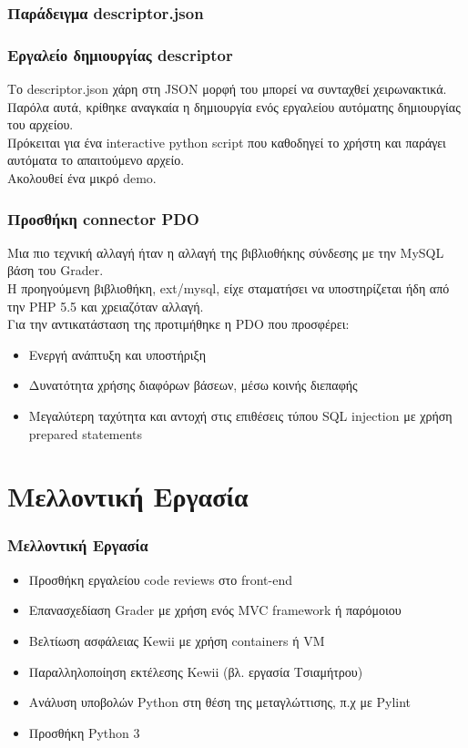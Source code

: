 \documentclass{beamer}
\begin{document}
\begin{frame}
  \frametitle{Παράδειγμα descriptor.json}


\end{frame}

\begin{frame}
  \frametitle{Εργαλείο δημιουργίας descriptor}

  Το descriptor.json χάρη στη JSON μορφή του μπορεί να συνταχθεί χειρωνακτικά. \\[0.3cm]

  Παρόλα αυτά, κρίθηκε αναγκαία η δημιουργία ενός εργαλείου αυτόματης δημιουργίας
  του αρχείου.\\[0.3cm]

  Πρόκειται για ένα interactive python script που καθοδηγεί το χρήστη και παράγει
  αυτόματα το απαιτούμενο αρχείο. \\[0.3cm]

  Ακολουθεί ένα μικρό demo.
\end{frame}

\begin{frame}
  \frametitle{Προσθήκη connector PDO}

  Μια πιο τεχνική αλλαγή ήταν η αλλαγή της βιβλιοθήκης σύνδεσης με την MySQL βάση
  του Grader.\\[0.3cm]

  Η προηγούμενη βιβλιοθήκη, ext/mysql, είχε σταματήσει να υποστηρίζεται ήδη από
  την PHP 5.5 και χρειαζόταν αλλαγή.\\[0.3cm]

  Για την αντικατάσταση της προτιμήθηκε η PDO που προσφέρει:

  \begin{itemize}
      \item Ενεργή ανάπτυξη και υποστήριξη
      \item Δυνατότητα χρήσης διαφόρων βάσεων, μέσω κοινής διεπαφής
      \item Μεγαλύτερη ταχύτητα και αντοχή στις επιθέσεις τύπου SQL injection με
        χρήση prepared statements
  \end{itemize}
\end{frame}

\section{Μελλοντική Εργασία}
\begin{frame}
  \frametitle{Μελλοντική Εργασία}
  \begin{itemize}
      \item Προσθήκη εργαλείου code reviews στο front-end
      \item Επανασχεδίαση Grader με χρήση ενός MVC framework ή παρόμοιου
      \item Βελτίωση ασφάλειας Kewii με χρήση containers ή VM
      \item Παραλληλοποίηση εκτέλεσης Kewii (βλ. εργασία Τσιαμήτρου)
      \item Ανάλυση υποβολών Python στη θέση της μεταγλώττισης, π.χ με Pylint
      \item Προσθήκη Python 3
  \end{itemize}
\end{frame}
\end{document}
